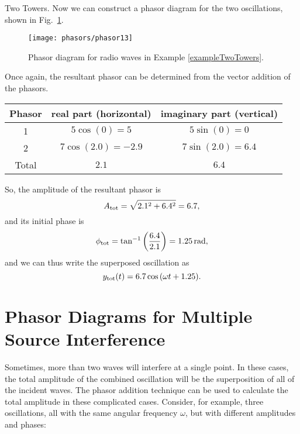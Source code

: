 \begin{exampleb}{Two Towers.}
Now we can construct a phasor diagram for the two oscillations, shown
in Fig.~\ref{fig:phasor13}.

\begin{figure}\begin{center}
 \texttt{[image: phasors/phasor13]} 
\caption{\label{fig:phasor13}Phasor diagram for radio waves in 
Example \ref{exampleTwoTowers}.}
\end{center}
\end{figure}

Once again, the resultant phasor can be determined from the vector
addition of the phasors.

\renewcommand{\arraystretch}{2.0}
\begin{center}
\begin{tabular}{|c|c|c|}\hline
\quad Phasor\quad\mbox{} &
\quad real part (horizontal) \quad \mbox{}&
\quad imaginary part (vertical) \quad\mbox{} \\ 
\hline\hline
1      & $5\cos{\left(0\right)}=5$ & $5\sin{\left(0\right)}=0$ \\
\hline
2      & $7\cos{\left(2.0\right)}=-2.9$ & $7\sin{\left(2.0\right)}=6.4$ \\
\hline\hline
Total  & $2.1$   & $6.4$ \\
\hline
\end{tabular}
\end{center}
\renewcommand{\arraystretch}{1.0}
\vspace{0.08in}

So, the amplitude of the resultant phasor is 
\begin{equation}
A_{\rm tot} = \sqrt{2.1^2 + 6.4^2} = 6.7,
\end{equation}
and its initial phase is
\begin{equation}
\phi_{\rm tot} = \tan^{-1}{\left(\frac{6.4}{2.1}\right)} 
      = 1.25\,\mbox{rad},
\end{equation} 
and we can thus write the superposed oscillation as
\begin{equation}
y_{\rm tot}(t) = 6.7\cos{(\omega t + 1.25)}. 
\end{equation}
\end{exampleb}

\section[Multi-Source Interference]{Phasor Diagrams for Multiple Source Interference}

Sometimes, more than two waves will interfere at a single point. In
these cases, the total amplitude of the combined oscillation will be
the superposition of all of the incident waves. The phasor addition
technique can be used to calculate the total amplitude in these
complicated cases. Consider, for example, three oscillations, all with
the same angular frequency $\omega$, but with different amplitudes and
phases:

